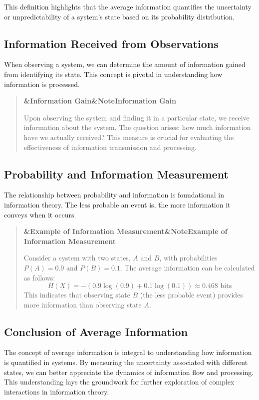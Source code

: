 \documentclass[a4paper]{article}
\newcommand{\boxheading}[1]{%
  \par\smallskip
  \noindent\textbf{\ifx&#1&Note\else#1\fi}\par
  \smallskip
}
\newenvironment{exbox}[1][]{%
  \begin{quote}\color{brown!70!black}\boxheading{#1}\normalcolor
}{\end{quote}}
\newenvironment{rembox}[1][]{%
  \begin{quote}\color{black!70}\boxheading{#1}\normalcolor
}{\end{quote}}
\begin{document}
This definition highlights that the average information quantifies the uncertainty or unpredictability of a system's state based on its probability distribution. 

\subsection{Information Received from Observations}
When observing a system, we can determine the amount of information gained from identifying its state. This concept is pivotal in understanding how information is processed.

\begin{rembox}[Information Gain]
Upon observing the system and finding it in a particular state, we receive information about the system. The question arises: how much information have we actually received? This measure is crucial for evaluating the effectiveness of information transmission and processing.
\end{rembox}

\subsection{Probability and Information Measurement}
The relationship between probability and information is foundational in information theory. The less probable an event is, the more information it conveys when it occurs. 

\begin{exbox}[Example of Information Measurement]
Consider a system with two states, \( A \) and \( B \), with probabilities \( P(A) = 0.9 \) and \( P(B) = 0.1 \). The average information can be calculated as follows:
\[
H(X) = -\left(0.9 \log(0.9) + 0.1 \log(0.1)\right) \approx 0.468 \text{ bits}
\]
This indicates that observing state \( B \) (the less probable event) provides more information than observing state \( A \).
\end{exbox}

\subsection{Conclusion of Average Information}
The concept of average information is integral to understanding how information is quantified in systems. By measuring the uncertainty associated with different states, we can better appreciate the dynamics of information flow and processing. This understanding lays the groundwork for further exploration of complex interactions in information theory.
\end{document}
